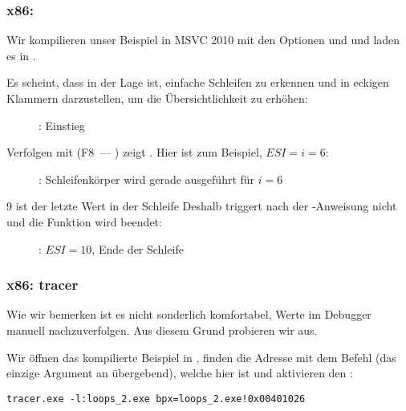\clearpage
\subsubsection{x86: \olly}
\myindex{\olly}

Wir kompilieren unser Beispiel in MSVC 2010 mit den Optionen \Ox und \Obzero und
laden es in \olly.

Es scheint, dass \olly in der Lage ist, einfache Schleifen zu erkennen und in
eckigen Klammern darzustellen, um die Übersichtlichkeit zu erhöhen:

\begin{figure}[H]
\centering
{}
\caption{\olly: \main Einstieg}
\label{fig:loops_olly_1}
\end{figure}

Verfolgen mit (F8~--- \stepover) zeigt \ESI 
{}.
Hier ist zum Beispiel, $ESI=i=6$:

\begin{figure}[H]
\centering
{}
\caption{\olly: Schleifenkörper wird gerade ausgeführt für $i=6$}
\label{fig:loops_olly_2}
\end{figure}

9 ist der letzte Wert in der Schleife
Deshalb triggert \JL nach der -Anweisung nicht und die Funktion
wird beendet:

\begin{figure}[H]
\centering
{}
\caption{\olly: $ESI=10$, Ende der Schleife}
\label{fig:loops_olly_3}
\end{figure}

\subsubsection{x86: tracer}

Wie wir bemerken ist es nicht sonderlich komfortabel, Werte im Debugger manuell
nachzuverfolgen. Aus diesem Grund probieren wir \tracer aus.

Wir öffnen das kompilierte Beispiel in \IDA, finden die Adresse mit dem Befehl
 (das einzige Argument an \ttf übergebend), welche hier
 ist und aktivieren den \tracer:


\begin{lstlisting}
tracer.exe -l:loops_2.exe bpx=loops_2.exe!0x00401026
\end{lstlisting}

